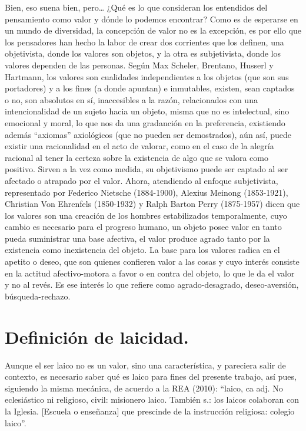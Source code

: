 Bien, eso suena bien, pero… ¿Qué es lo que consideran los entendidos del pensamiento como valor y dónde lo podemos encontrar? Como es de esperarse en un mundo de diversidad, la concepción de valor no es la excepción, es por ello que los pensadores han hecho la labor de crear dos corrientes que los definen, una objetivista, donde los valores son objetos, y la otra es subjetivista, donde los valores dependen de las personas. Según Max Scheler, Brentano, Husserl y Hartmann, los valores son cualidades independientes a los objetos (que son sus portadores) y a los fines (a donde apuntan) e inmutables, existen, sean captados o no, son absolutos en sí, inaccesibles a la razón, relacionados con una intencionalidad de un sujeto hacia un objeto, misma que no es intelectual, sino emocional y moral, lo que nos da una gradanción en la preferencia, existiendo además “axiomas” axiológicos (que no pueden ser demostrados), aún así, puede existir una racionalidad en el acto de valorar, como en el caso de la alegría racional al tener la certeza sobre la existencia de algo que se valora como positivo. Sirven a la vez como medida, su objetivismo puede ser captado al ser afectado o atrapado por el valor. Ahora, atendiendo al enfoque subjetivista, representado por Federico Nietsche (1884-1900), Alexius Meinong (1853-1921), Christian Von Ehrenfels (1850-1932) y Ralph Barton Perry (1875-1957) dicen que los valores son una creación de los hombres estabilizados temporalmente, cuyo cambio es necesario para el progreso humano, un objeto posee valor en tanto pueda suministrar una base afectiva, el valor produce agrado tanto por la existencia como inexistencia del objeto. La base para los valores radica en el apetito o deseo, que son quienes confieren valor a las cosas y cuyo interés consiste en la actitud afectivo-motora a favor o en contra del objeto, lo que le da el valor y no al revés. Es ese interés lo que refiere como agrado-desagrado, deseo-aversión, búsqueda-rechazo.
\section{Definición de laicidad.}
Aunque el ser laico no es un valor, sino una característica, y pareciera salir de contexto, es necesario saber qué es laico para fines del presente trabajo, así pues, siguiendo la misma mecánica, de acuerdo a la REA (2010): “laico, ca adj. No eclesiástico ni religioso, civil: misionero laico. También s.: los laicos colaboran con la Iglesia. [Escuela o enseñanza] que prescinde de la instrucción religiosa: colegio laico”.

